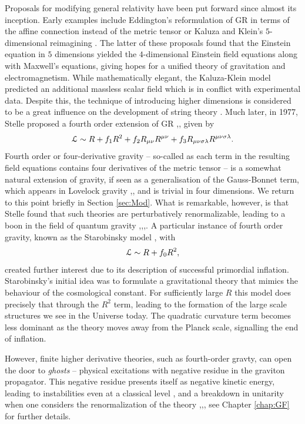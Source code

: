 Proposals for modifying general relativity have been put forward since almost its inception. Early examples include Eddington's reformulation of GR in terms of the affine connection instead of the metric tensor or Kaluza and Klein's $5$-dimensional reimagining  \cite{Clifton:2011jh}. The latter of these proposals found that the Einstein equation in $5$ dimensions yielded the $4$-dimensional Einstein field equations along with Maxwell's equations, giving hopes for a unified theory of gravitation and electromagnetism. While mathematically elegant, the Kaluza-Klein model predicted an additional massless scalar field which is in conflict with experimental data. Despite this, the technique of introducing higher dimensions is considered to be a great influence on the development of string theory \cite{zwiebach2004first}. Much later, in 1977, Stelle proposed a fourth order extension of GR \cite{Stelle:1976gc},\cite{Stelle1978}, given by
\[
{\cal L}\sim R+f_1 R^2 +f_2 R_{\mu\nu}R^{\mu\nu}+f_3 R_{\mu\nu\sigma\lambda}R^{\mu\nu\sigma\lambda}.
\] 
Fourth order or four-derivative gravity -- so-called as each term in the resulting field equations contains four derivatives of the metric tensor -- is a somewhat natural extension of gravity, if seen as a generalisation of the Gauss-Bonnet term, which appears in Lovelock gravity \cite{LovelockGB},\cite{Lovelock1969}, and is trivial in four dimensions. We return to this point briefly in Section \ref{sec:Mod}. What is remarkable, however, is that Stelle found that such theories are perturbatively renormalizable, leading to a boon in the field of quantum gravity \cite{Schmidt:2006jt},\cite{Kiefer:2012boa},\cite{Stelle:1976gc},\cite{Hamber:2007fk}. A particular instance of fourth order gravity, known as the Starobinsky model \cite{Starobinsky:1979ty}, with
\[
{\cal L}\sim R+f_0 R^2
,\]
created further interest due to its description of successful primordial inflation. Starobinsky's initial idea was to formulate a gravitational theory that mimics the behaviour of the cosmological constant. For sufficiently large $R$ this model does precisely that through the $R^2$ term, leading to the formation of the large scale structures we see in the Universe today. The quadratic curvature term becomes less dominant as the theory moves away from the Planck scale, signalling the end of inflation. 

However, finite higher derivative theories, such as fourth-order gravty, can open the door to \emph{ghosts} -- physical excitations with negative residue in the graviton propagator. This negative residue presents itself as negative kinetic energy, leading to instabilities even at a classical level \cite{Himmetoglu:2009qi}, and a breakdown in unitarity when one considers the renormalization of the theory \cite{Stelle:1976gc},\cite{Biswas:2013kla},\cite{Rubakov:2014jja}, see Chapter \ref{chap:GF} for further details.  


